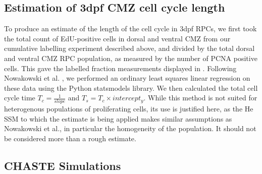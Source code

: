 \subsection{Estimation of 3dpf CMZ cell cycle length}
To produce an estimate of the length of the cell cycle in 3dpf RPCs, we first took the total count of EdU-positive cells in dorsal and ventral CMZ from our cumulative labelling experiment described above, and divided by the total dorsal and ventral CMZ RPC population, as measured by the number of PCNA positive cells. This gave the labelled fraction measurements displayed in . Following Nowakowski et al. \cite{Nowakowski1989}, we performed an ordinary least squares linear regression on these data using the Python statsmodels library. We then calculated the total cell cycle time $T_c = \frac{1}{slope}$ and $T_s = T_c \times intercept_y$. While this method is not suited for heterogenous populations of proliferating cells, its use is justified here, as the He SSM to which the estimate is being applied makes similar assumptions as Nowakowski et al., in particular the homogeneity of the population. It should not be considered more than a rough estimate.

\subsection{CHASTE Simulations}
